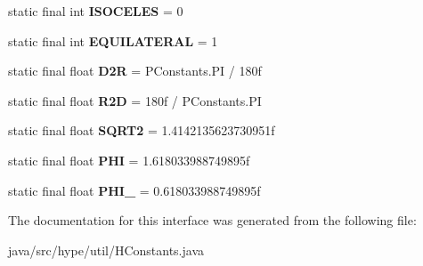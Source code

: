 \begin{DoxyCompactItemize}
\item 
\hypertarget{interfacehype_1_1util_1_1_h_constants_a46aacafd0bfd088dd23ff151106674c3}{static final int {\bfseries I\-S\-O\-C\-E\-L\-E\-S} = 0}\label{interfacehype_1_1util_1_1_h_constants_a46aacafd0bfd088dd23ff151106674c3}

\item 
\hypertarget{interfacehype_1_1util_1_1_h_constants_a1d9dbd4ac52de3b1fc2feb6c234c747f}{static final int {\bfseries E\-Q\-U\-I\-L\-A\-T\-E\-R\-A\-L} = 1}\label{interfacehype_1_1util_1_1_h_constants_a1d9dbd4ac52de3b1fc2feb6c234c747f}

\item 
\hypertarget{interfacehype_1_1util_1_1_h_constants_a5ed71fb4b47e5babb0bba63b4bb0c5fa}{static final float {\bfseries D2\-R} = P\-Constants.\-P\-I / 180f}\label{interfacehype_1_1util_1_1_h_constants_a5ed71fb4b47e5babb0bba63b4bb0c5fa}

\item 
\hypertarget{interfacehype_1_1util_1_1_h_constants_a7ce3b8de220fac7fcd9c35758912dc90}{static final float {\bfseries R2\-D} = 180f / P\-Constants.\-P\-I}\label{interfacehype_1_1util_1_1_h_constants_a7ce3b8de220fac7fcd9c35758912dc90}

\item 
\hypertarget{interfacehype_1_1util_1_1_h_constants_a6dd14b2b18bcb7b28751d7df61b3297b}{static final float {\bfseries S\-Q\-R\-T2} = 1.\-4142135623730951f}\label{interfacehype_1_1util_1_1_h_constants_a6dd14b2b18bcb7b28751d7df61b3297b}

\item 
\hypertarget{interfacehype_1_1util_1_1_h_constants_ae09a355ec56553ad5f3fe11fa67c49ed}{static final float {\bfseries P\-H\-I} = 1.\-618033988749895f}\label{interfacehype_1_1util_1_1_h_constants_ae09a355ec56553ad5f3fe11fa67c49ed}

\item 
\hypertarget{interfacehype_1_1util_1_1_h_constants_a1d71bbb29142357c1db975fe388751a8}{static final float {\bfseries P\-H\-I\-\_} = 0.\-618033988749895f}\label{interfacehype_1_1util_1_1_h_constants_a1d71bbb29142357c1db975fe388751a8}

\end{DoxyCompactItemize}


The documentation for this interface was generated from the following file\-:\begin{DoxyCompactItemize}
\item 
java/src/hype/util/H\-Constants.\-java\end{DoxyCompactItemize}
